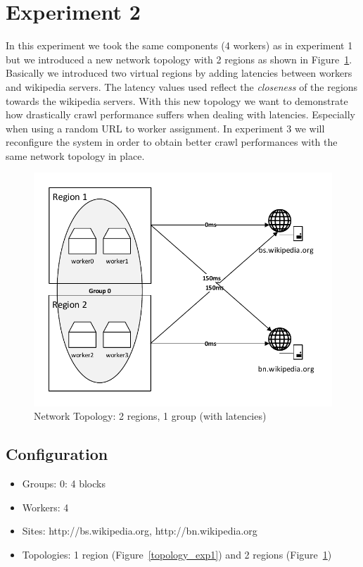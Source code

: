 \section{Experiment 2}

In this experiment we took the same components (4 workers) as in experiment 1 but we introduced a new network topology with 2 regions as shown in Figure~\ref{topology_exp2}. Basically we introduced two virtual regions by adding latencies between workers and wikipedia servers. The latency values used reflect the \emph{closeness} of the regions towards the wikipedia servers. With this new topology we want to demonstrate how drastically crawl performance suffers when dealing with latencies. Especially when using a random URL to worker assignment. In experiment 3 we will reconfigure the system in order to obtain better crawl performances with the same network topology in place.

\begin{figure}[h]
\centering
  \includegraphics[width=1.0\textwidth]{Figures/topology_exp2.pdf}
  \caption{Network Topology: 2 regions, 1 group (with latencies)}
\label{topology_exp2}
\end{figure}

\subsection{Configuration}
\begin{itemize}
  \item Groups: 0: 4 blocks
  \item Workers: 4
  \item Sites: http://bs.wikipedia.org, http://bn.wikipedia.org
  \item Topologies: 1 region (Figure~\ref{topology_exp1}) and 2 regions (Figure~\ref{topology_exp2})
\end{itemize}

